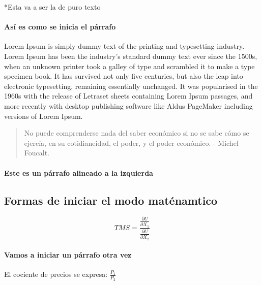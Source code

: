 \documentclass{article}
\begin{document}
  
  \begingroup
    \begin{section}*{Esta va a ser la de puro texto}
      \paragraph*{Así es como se inicia el párrafo}
      Lorem Ipsum is simply dummy text of the printing and typesetting 
      industry. Lorem Ipsum has been the industry's standard dummy text 
      ever since the 1500s, when an unknown printer took a galley of type
       and scrambled it to make a type specimen book. It has survived 
       not only five centuries, but also the leap into electronic 
       typesetting, remaining essentially unchanged. It was popularised 
       in the 1960s with the release of Letraset sheets containing Lorem 
       Ipsum passages, and more recently with desktop publishing software 
      like Aldus PageMaker including versions of Lorem Ipsum. 
      \par
  
      \begin{quote}
        No puede comprenderse nada del saber económico si no se sabe cómo se 
        ejercía, en su cotidianeidad, el poder, y el poder económico. - Michel 
        Foucalt.
        \par 
      \end{quote}

      
      \paragraph*{Este es un párrafo alineado a la izquierda}

  \endgroup

  \newpage

  \begingroup
    \section*{Formas de iniciar el modo maténamtico}
      \[ TMS = \frac{
          \frac{
            \partial U}
          {
            \partial X_1}
        }
        {
          \frac{
            \partial U}
          {
            \partial X_2
          }
        }
      \]

      \paragraph[¿Aquí que es?]{Vamos a iniciar un párrafo otra vez}
      El cociente de precios se expresa: \(\frac{P_1}{P_2}\) \par
      

\end{section}
\end{document}
